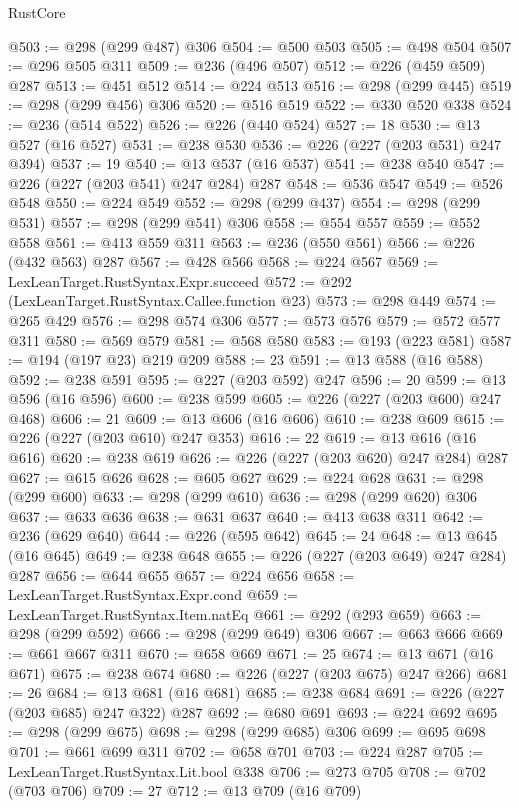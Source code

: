 \begin{lexlean}{RustCore}
\begin{coremodule}
@503 := @298 (@299 @487) @306
@504 := @500 @503
@505 := @498 @504
@507 := @296 @505 @311
@509 := @236 (@496 @507)
@512 := @226 (@459 @509) @287
@513 := @451 @512
@514 := @224 @513
@516 := @298 (@299 @445)
@519 := @298 (@299 @456) @306
@520 := @516 @519
@522 := @330 @520 @338
@524 := @236 (@514 @522)
@526 := @226 (@440 @524)
@527 := 18
@530 := @13 @527 (@16 @527)
@531 := @238 @530
@536 := @226 (@227 (@203 @531) @247 @394)
@537 := 19
@540 := @13 @537 (@16 @537)
@541 := @238 @540
@547 := @226 (@227 (@203 @541) @247 @284) @287
@548 := @536 @547
@549 := @526 @548
@550 := @224 @549
@552 := @298 (@299 @437)
@554 := @298 (@299 @531)
@557 := @298 (@299 @541) @306
@558 := @554 @557
@559 := @552 @558
@561 := @413 @559 @311
@563 := @236 (@550 @561)
@566 := @226 (@432 @563) @287
@567 := @428 @566
@568 := @224 @567
@569 := LexLeanTarget.RustSyntax.Expr.succeed
@572 := @292 (LexLeanTarget.RustSyntax.Callee.function @23)
@573 := @298 @449
@574 := @265 @429
@576 := @298 @574 @306
@577 := @573 @576
@579 := @572 @577 @311
@580 := @569 @579
@581 := @568 @580
@583 := @193 (@223 @581)
@587 := @194 (@197 @23) @219 @209
@588 := 23
@591 := @13 @588 (@16 @588)
@592 := @238 @591
@595 := @227 (@203 @592) @247
@596 := 20
@599 := @13 @596 (@16 @596)
@600 := @238 @599
@605 := @226 (@227 (@203 @600) @247 @468)
@606 := 21
@609 := @13 @606 (@16 @606)
@610 := @238 @609
@615 := @226 (@227 (@203 @610) @247 @353)
@616 := 22
@619 := @13 @616 (@16 @616)
@620 := @238 @619
@626 := @226 (@227 (@203 @620) @247 @284) @287
@627 := @615 @626
@628 := @605 @627
@629 := @224 @628
@631 := @298 (@299 @600)
@633 := @298 (@299 @610)
@636 := @298 (@299 @620) @306
@637 := @633 @636
@638 := @631 @637
@640 := @413 @638 @311
@642 := @236 (@629 @640)
@644 := @226 (@595 @642)
@645 := 24
@648 := @13 @645 (@16 @645)
@649 := @238 @648
@655 := @226 (@227 (@203 @649) @247 @284) @287
@656 := @644 @655
@657 := @224 @656
@658 := LexLeanTarget.RustSyntax.Expr.cond
@659 := LexLeanTarget.RustSyntax.Item.natEq
@661 := @292 (@293 @659)
@663 := @298 (@299 @592)
@666 := @298 (@299 @649) @306
@667 := @663 @666
@669 := @661 @667 @311
@670 := @658 @669
@671 := 25
@674 := @13 @671 (@16 @671)
@675 := @238 @674
@680 := @226 (@227 (@203 @675) @247 @266)
@681 := 26
@684 := @13 @681 (@16 @681)
@685 := @238 @684
@691 := @226 (@227 (@203 @685) @247 @322) @287
@692 := @680 @691
@693 := @224 @692
@695 := @298 (@299 @675)
@698 := @298 (@299 @685) @306
@699 := @695 @698
@701 := @661 @699 @311
@702 := @658 @701
@703 := @224 @287
@705 := LexLeanTarget.RustSyntax.Lit.bool @338
@706 := @273 @705
@708 := @702 (@703 @706)
@709 := 27
@712 := @13 @709 (@16 @709)

\end{coremodule}
\end{lexlean}
